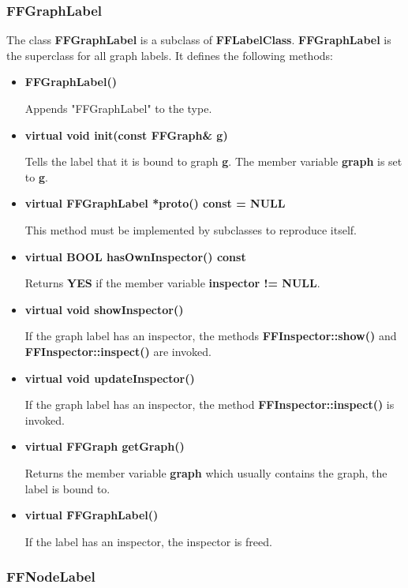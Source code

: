 \subsubsection{FFGraphLabel}

The class {\bf FFGraphLabel} is a subclass of {\bf FFLabelClass}.
{\bf FFGraphLabel} is the superclass for all graph labels. It
defines the following methods:

\begin{itemize}
  
\item{\bf FFGraphLabel()}

Appends "FFGraphLabel" to the type.

\item{\bf virtual void init(const FFGraph\& g)}
  
  Tells the label that it is bound to graph {\bf g}. The member
  variable {\bf graph} is set to {\bf g}.

\item{\bf virtual FFGraphLabel *proto() const = NULL}

This method must be implemented by subclasses to reproduce itself.

\item{\bf virtual BOOL hasOwnInspector() const}

Returns {\bf YES} if the member variable {\bf inspector != NULL}.
 
\item{\bf virtual void showInspector()}
  
  If the graph label has an inspector, the methods {\bf
    FFInspector::show()} and {\bf FFInspector::inspect()} are
  invoked.

\item{\bf virtual void updateInspector()}
  
  If the graph label has an inspector, the method {\bf
    FFInspector::inspect()} is invoked.

\item{\bf virtual FFGraph getGraph()}
  
  Returns the member variable {\bf graph} which usually contains
  the graph, the label is bound to.

\item{\bf virtual \~FFGraphLabel()}

If the label has an inspector, the inspector is freed.

\end{itemize}

\subsubsection{FFNodeLabel}

